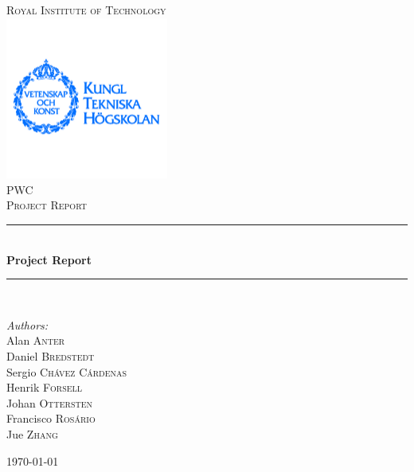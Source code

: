 \documentclass[12pt,a4paper,openright]{article}
\newcommand{\HRule}{\rule{\linewidth}{0.5mm}}
\begin{document}
\begin{titlepage}
\begin{center}
\textsc{\LARGE Royal Institute of Technology}\\[0.3cm]
\includegraphics[width=0.4\textwidth]{./logo}~\\[0.3cm]


\textsc{\Large PWC \\ Project Report}\\[0.5cm]

\HRule \\[0.4cm]
{ \huge \bfseries Project Report \\[0.4cm] }

\HRule \\[1.5cm]

\begin{minipage}{0.4\textwidth}
\begin{flushleft} \large
\emph{Authors:}\\
Alan \textsc{Anter} \\
Daniel \textsc{Bredstedt}\\
Sergio \textsc{Chávez Cárdenas}\\
Henrik \textsc{Forsell}\\
Johan \textsc{Ottersten}\\
Francisco \textsc{Rosário}\\
Jue \textsc{Zhang}\\

\end{flushleft}
\end{minipage}
\vfill
{\large \today}



\end{center}
\end{titlepage}


\end{document}
